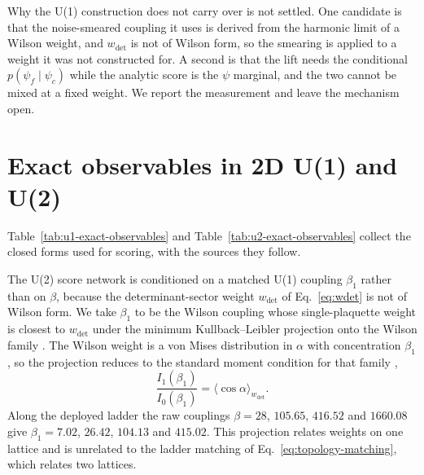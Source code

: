 \documentclass[prd, twocolumn, superscriptaddress, nofootinbib,floatfix]{revtex4-2}
\DeclareRobustCommand{\Eq}[1]{Eq.~\eqref{eq:#1}}
\DeclareRobustCommand{\tb}[1]{Table~\ref{tab:#1}}
\begin{document}
Why the U(1) construction does not carry over is not settled. One candidate is
that the noise-smeared coupling it uses is derived from the harmonic limit of a
Wilson weight, and $w_{\det}$ is not of Wilson form, so the smearing is applied
to a weight it was not constructed for. A second is that the lift needs the
conditional $p(\psi_f\mid\psi_c)$ while the analytic score is the $\psi$
marginal, and the two cannot be mixed at a fixed weight. We report the
measurement and leave the mechanism open.

\section{Exact observables in 2D U(1) and U(2)}
\label{app:exact}

\tb{u1-exact-observables} and \tb{u2-exact-observables} collect the closed forms
used for scoring, with the sources they follow.

The U(2) score network is conditioned on a matched U(1) coupling $\beta_1$
rather than on $\beta$, because the determinant-sector weight $w_{\det}$ of
\Eq{wdet} is not of Wilson form. We take $\beta_1$ to be the Wilson coupling
whose single-plaquette weight is closest to $w_{\det}$ under the minimum
Kullback--Leibler projection onto the Wilson family \cite{amarinagaoka2000}.
The Wilson weight is a von Mises distribution in $\alpha$ with concentration
$\beta_1$, so the projection reduces to the standard moment condition for that
family \cite{mardiajupp2000},
\begin{equation}
    \frac{I_1(\beta_1)}{I_0(\beta_1)} = \langle\cos\alpha\rangle_{w_{\det}}.
    \label{eq:vonmises}
\end{equation}
Along the deployed ladder the raw couplings $\beta=28$, $105.65$, $416.52$ and
$1660.08$ give $\beta_1=7.02$, $26.42$, $104.13$ and $415.02$. This projection
relates weights on one lattice and is unrelated to the ladder matching of
\Eq{topology-matching}, which relates two lattices.
\end{document}
